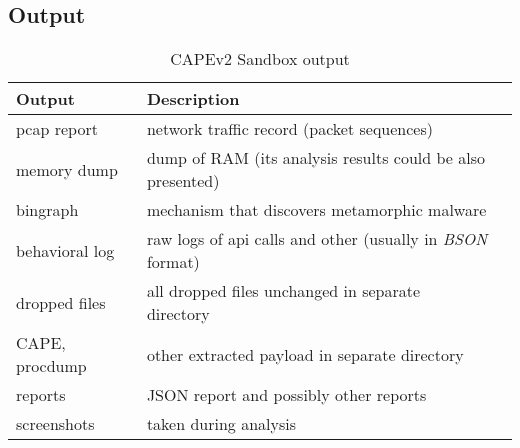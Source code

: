   \subsection*{Output}
  \begin{table}[h]
    \centering
    \caption{CAPEv2 Sandbox output}
    \begin{tabular}{p{2cm}p{6cm}p{6cm}} 
        \toprule
        \textbf{Output} &
        \textbf{Description} \\
        \midrule
        pcap report & network traffic record (packet sequences) \\
        \midrule
        memory dump & dump of RAM (its analysis results could be also presented) \\
        \midrule
        bingraph & mechanism that discovers metamorphic malware \cite{Kwon2012}\\
        \midrule
        behavioral log & raw logs of api calls and other (usually in \emph{BSON} format) \\
        \midrule
        dropped files & all dropped files unchanged in separate directory \\
        \midrule
        CAPE, procdump & other extracted payload in separate directory \\
        \midrule
        reports & JSON report and possibly other reports  \\
        \midrule
        screenshots & taken during analysis  \\
        \bottomrule
    \end{tabular}
    \label{tab:sandbox-out}
  \end{table}

